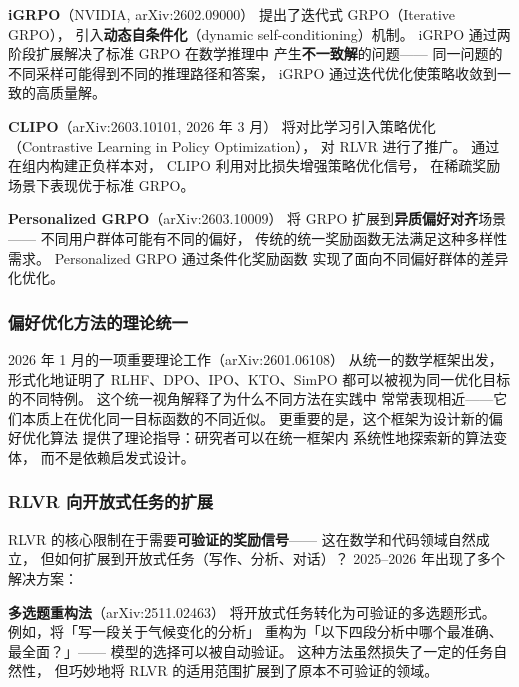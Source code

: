 
\textbf{iGRPO}（NVIDIA, arXiv:2602.09000）
提出了迭代式 GRPO（Iterative GRPO），
引入\textbf{动态自条件化}（dynamic self-conditioning）机制。
iGRPO 通过两阶段扩展解决了标准 GRPO 在数学推理中
产生\textbf{不一致解}的问题——
同一问题的不同采样可能得到不同的推理路径和答案，
iGRPO 通过迭代优化使策略收敛到一致的高质量解。


\textbf{CLIPO}（arXiv:2603.10101, 2026 年 3 月）
将对比学习引入策略优化（Contrastive Learning in Policy Optimization），
对 RLVR 进行了推广。
通过在组内构建正负样本对，
CLIPO 利用对比损失增强策略优化信号，
在稀疏奖励场景下表现优于标准 GRPO。


\textbf{Personalized GRPO}（arXiv:2603.10009）
将 GRPO 扩展到\textbf{异质偏好对齐}场景——
不同用户群体可能有不同的偏好，
传统的统一奖励函数无法满足这种多样性需求。
Personalized GRPO 通过条件化奖励函数
实现了面向不同偏好群体的差异化优化。

\subsubsection{偏好优化方法的理论统一}


2026 年 1 月的一项重要理论工作（arXiv:2601.06108）
从统一的数学框架出发，
形式化地证明了 RLHF、DPO、IPO、KTO、SimPO
都可以被视为同一优化目标的不同特例。
这个统一视角解释了为什么不同方法在实践中
常常表现相近——它们本质上在优化同一目标函数的不同近似。
更重要的是，这个框架为设计新的偏好优化算法
提供了理论指导：研究者可以在统一框架内
系统性地探索新的算法变体，
而不是依赖启发式设计。

\subsubsection{RLVR 向开放式任务的扩展}

RLVR 的核心限制在于需要\textbf{可验证的奖励信号}——
这在数学和代码领域自然成立，
但如何扩展到开放式任务（写作、分析、对话）？
2025--2026 年出现了多个解决方案：

\textbf{多选题重构法}（arXiv:2511.02463）
将开放式任务转化为可验证的多选题形式。
例如，将「写一段关于气候变化的分析」
重构为「以下四段分析中哪个最准确、最全面？」——
模型的选择可以被自动验证。
这种方法虽然损失了一定的任务自然性，
但巧妙地将 RLVR 的适用范围扩展到了原本不可验证的领域。

